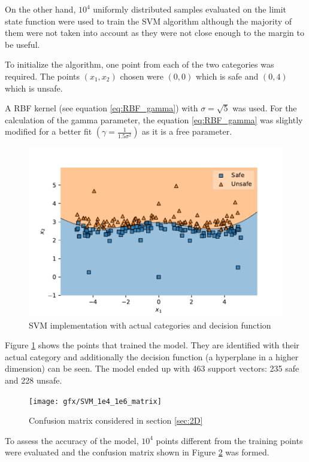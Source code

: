 On the other hand, \(10^4\) uniformly distributed samples evaluated on the limit state function were used to train the \ac{SVM} algorithm although the majority of them were not taken into account as they were not close enough to the margin to be useful.

To initialize the algorithm, one point from each of the two categories was required. The points \((x_1, x_2)\) chosen were \((0,0)\) which is safe and \((0,4)\) which is unsafe.

A \ac{RBF} kernel (see equation \ref{eq:RBF_gamma}) with \(\sigma = \sqrt{5}\) was used. For the calculation of the gamma parameter, the equation \ref{eq:RBF_gamma} was slightly modified for a better fit \( \left ( \gamma = \tfrac{1}{1.5 \sigma^2} \right) \) as it is a free parameter.

\begin{figure}
	\myfloatalign
	\includegraphics[width=0.7\linewidth]{gfx/SVM_1e4_1e6}
	\caption[SVM implementation]{SVM implementation with actual categories and decision function}
	\label{fig:2D_SVM}
\end{figure}

Figure \ref{fig:2D_SVM} shows the points that trained the model. They are identified with their actual category and additionally the decision function (a hyperplane in a higher dimension) can be seen. The model ended up with 463 support vectors: 235 safe and 228 unsafe.

\begin{figure}
	\myfloatalign
	\texttt{[image: gfx/SVM\_1e4\_1e6\_matrix]}
	\caption{Confusion matrix considered in section \ref{sec:2D}}
	\label{fig:2D_SVM_matrix}
\end{figure}

To assess the accuracy of the model, \(10^4\) points different from the training points were evaluated and the confusion matrix shown in Figure \ref{fig:2D_SVM_matrix} was formed.

